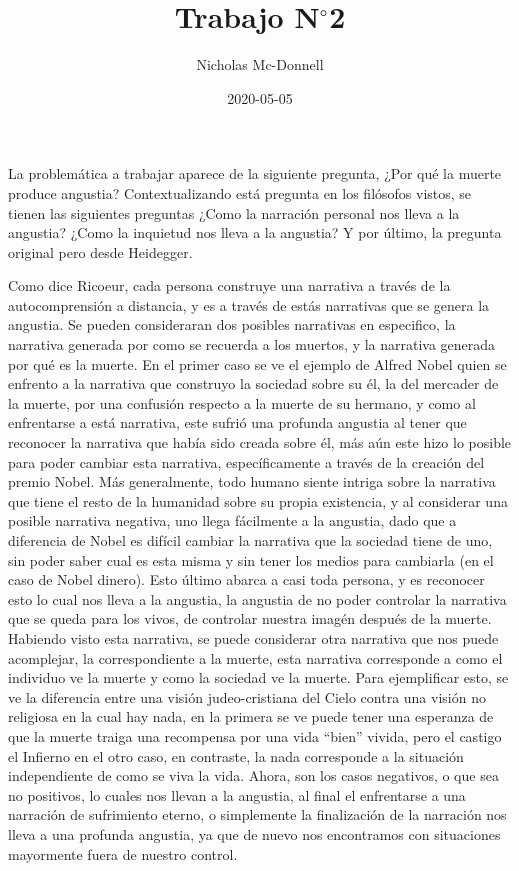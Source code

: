 \documentclass{homework}
\title{Trabajo N$^{\circ}$2}
\date{2020-05-05}
\author{Nicholas Mc-Donnell}
\begin{document}
\maketitle

La problemática a trabajar aparece de la siguiente pregunta, ¿Por qué la muerte produce angustia? Contextualizando está pregunta en los filósofos vistos, se tienen las siguientes preguntas ¿Como la narración personal nos lleva a la angustia? ¿Como la inquietud nos lleva a la angustia? Y por último, la pregunta original pero desde Heidegger.

Como dice Ricoeur, cada persona construye una narrativa a través de la autocomprensión a distancia, y es a través de estás narrativas que se genera la angustia. Se pueden consideraran dos posibles narrativas en especifico, la narrativa generada por como se recuerda a los muertos, y la narrativa generada por qué es la muerte. En el primer caso se ve el ejemplo de Alfred Nobel quien se enfrento a la narrativa que construyo la sociedad sobre su él, la del mercader de la muerte, por una confusión respecto a la muerte de su hermano, y como al enfrentarse a está narrativa, este sufrió una profunda angustia al tener que reconocer la narrativa que había sido creada sobre él, más aún este hizo lo posible para poder cambiar esta narrativa, específicamente a través de la creación del premio Nobel. Más generalmente, todo humano siente intriga sobre la narrativa que tiene el resto de la humanidad sobre su propia existencia, y al considerar una posible narrativa negativa, uno llega fácilmente a la angustia, dado que a diferencia de Nobel es difícil cambiar la narrativa que la sociedad tiene de uno, sin poder saber cual es esta misma y sin tener los medios para cambiarla (en el caso de Nobel dinero). Esto último abarca a casi toda persona, y es reconocer esto lo cual nos lleva a la angustia, la angustia de no poder controlar la narrativa que se queda para los vivos, de controlar nuestra imagén después de la muerte. Habiendo visto esta narrativa, se puede considerar otra narrativa que nos puede acomplejar, la correspondiente a la muerte, esta narrativa corresponde a como el individuo ve la muerte y como la sociedad ve la muerte. Para ejemplificar esto, se ve la diferencia entre una visión judeo-cristiana del Cielo contra una visión no religiosa en la cual hay nada, en la primera se ve puede tener una esperanza de que la muerte traiga una recompensa por una vida ``bien'' vivida, pero el castigo el Infierno en el otro caso, en contraste, la nada corresponde a la situación independiente de como se viva la vida. Ahora, son los casos negativos, o que sea no positivos, lo cuales nos llevan a la angustia, al final el enfrentarse a una narración de sufrimiento eterno, o simplemente la finalización de la narración nos lleva a una profunda angustia, ya que de nuevo nos encontramos con situaciones mayormente fuera de nuestro control.
\end{document}
